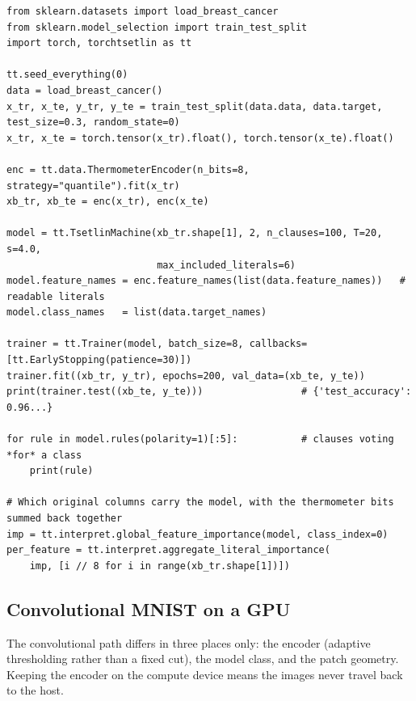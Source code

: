 \begin{lstlisting}[style=ttpython]
from sklearn.datasets import load_breast_cancer
from sklearn.model_selection import train_test_split
import torch, torchtsetlin as tt

tt.seed_everything(0)
data = load_breast_cancer()
x_tr, x_te, y_tr, y_te = train_test_split(data.data, data.target, test_size=0.3, random_state=0)
x_tr, x_te = torch.tensor(x_tr).float(), torch.tensor(x_te).float()

enc = tt.data.ThermometerEncoder(n_bits=8, strategy="quantile").fit(x_tr)
xb_tr, xb_te = enc(x_tr), enc(x_te)

model = tt.TsetlinMachine(xb_tr.shape[1], 2, n_clauses=100, T=20, s=4.0,
                          max_included_literals=6)
model.feature_names = enc.feature_names(list(data.feature_names))   # readable literals
model.class_names   = list(data.target_names)

trainer = tt.Trainer(model, batch_size=8, callbacks=[tt.EarlyStopping(patience=30)])
trainer.fit((xb_tr, y_tr), epochs=200, val_data=(xb_te, y_te))
print(trainer.test((xb_te, y_te)))                 # {'test_accuracy': 0.96...}

for rule in model.rules(polarity=1)[:5]:           # clauses voting *for* a class
    print(rule)

# Which original columns carry the model, with the thermometer bits summed back together
imp = tt.interpret.global_feature_importance(model, class_index=0)
per_feature = tt.interpret.aggregate_literal_importance(
    imp, [i // 8 for i in range(xb_tr.shape[1])])
\end{lstlisting}

\subsection{Convolutional MNIST on a GPU}

The convolutional path differs in three places only: the encoder (adaptive thresholding
rather than a fixed cut), the model class, and the patch geometry. Keeping the encoder on the
compute device means the images never travel back to the host.

